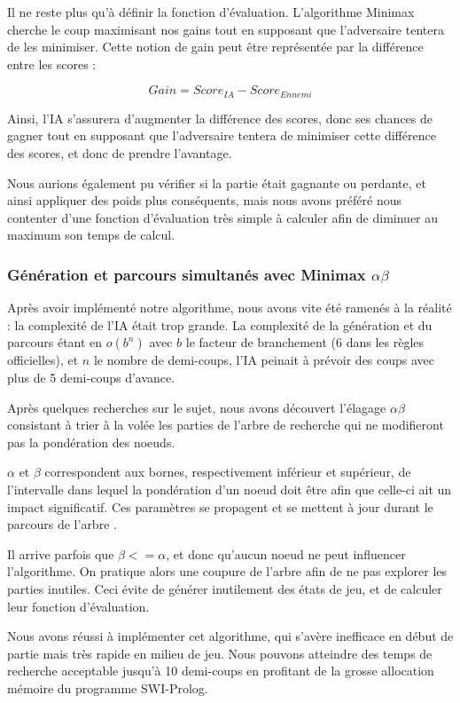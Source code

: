 \documentclass[]{article}
\begin{document}
Il ne reste plus qu'à définir la fonction d'évaluation. L'algorithme Minimax cherche le coup maximisant nos gains tout en supposant que l'adversaire tentera de les minimiser. Cette notion de gain peut être représentée par la différence entre les scores : 

$$Gain = Score_{IA} - Score_{Ennemi}$$

Ainsi, l'IA s'assurera d'augmenter la différence des scores, donc ses chances de gagner tout en supposant que l'adversaire tentera de minimiser cette différence des scores, et donc de prendre l'avantage.

Nous aurions également pu vérifier si la partie était gagnante ou perdante, et ainsi appliquer des poids plus conséquents, mais nous avons préféré nous contenter d'une fonction d'évaluation très simple à calculer afin de diminuer au maximum son temps de calcul.

\subsubsection{Génération et parcours simultanés avec Minimax $\alpha\beta$}

Après avoir implémenté notre algorithme, nous avons vite été ramenés à la réalité : la complexité de l'IA était trop grande. La complexité de la génération et du parcours étant en $o(b^{n})$ avec $b$ le facteur de branchement (6 dans les règles officielles), et $n$ le nombre de demi-coups, l'IA peinait à prévoir des coups avec plus de 5 demi-coups d'avance.

Après quelques recherches sur le sujet, nous avons découvert l'élagage $\alpha\beta$ consistant à trier à la volée les parties de l'arbre de recherche qui ne modifieront pas la pondération des noeuds.

$\alpha$ et $\beta$ correspondent aux bornes, respectivement inférieur et supérieur, de l'intervalle dans lequel la pondération d'un noeud doit être afin que celle-ci ait un impact significatif. Ces paramètres se propagent et se mettent à jour durant le parcours de l'arbre .

Il arrive parfois que $\beta <= \alpha$, et donc qu'aucun noeud ne peut influencer l'algorithme. On pratique alors une coupure de l'arbre afin de ne pas explorer les parties inutiles. Ceci évite de générer inutilement des états de jeu, et de calculer leur fonction d'évaluation.

Nous avons réussi à implémenter cet algorithme, qui s'avère inefficace en début de partie mais très rapide en milieu de jeu. Nous pouvons atteindre des temps de recherche acceptable jusqu'à 10 demi-coups en profitant de la grosse allocation mémoire du programme SWI-Prolog.
\end{document}
